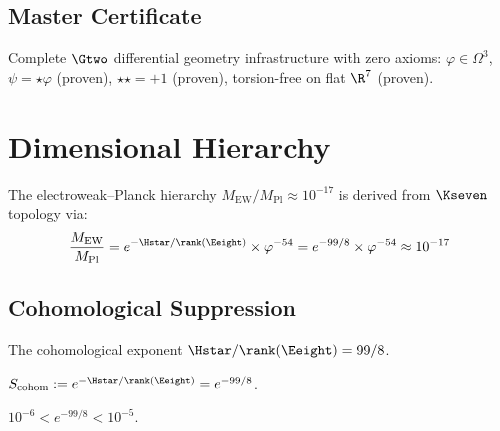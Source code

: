 \section{Master Certificate}

\begin{theorem}\label{thm:geometry_cert}
    \leanok
    Complete $\Gtwo$ differential geometry infrastructure with zero axioms:
    $\varphi \in \Omega^3$, $\psi = \star\varphi$ (proven), $\star\star = +1$ (proven),
    torsion-free on flat $\R^7$ (proven).
\end{theorem}


\chapter{Dimensional Hierarchy}\label{chap:hierarchy}

The electroweak--Planck hierarchy $M_{\mathrm{EW}}/M_{\mathrm{Pl}} \approx 10^{-17}$
is derived from $\Kseven$ topology via:
\[
    \frac{M_{\mathrm{EW}}}{M_{\mathrm{Pl}}} = e^{-\Hstar/\rank(\Eeight)} \times \varphi^{-54}
    = e^{-99/8} \times \varphi^{-54} \approx 10^{-17}
\]

\section{Cohomological Suppression}

\begin{definition}\label{def:cohom_ratio}
    \leanok
    The cohomological exponent $\Hstar / \rank(\Eeight) = 99/8$.
\end{definition}

\begin{definition}\label{def:cohom_suppression}
    \leanok
    $S_{\mathrm{cohom}} := e^{-\Hstar/\rank(\Eeight)} = e^{-99/8}$.
\end{definition}

\begin{theorem}\label{thm:cohom_magnitude}
    \leanok
    $10^{-6} < e^{-99/8} < 10^{-5}$.
\end{theorem}

